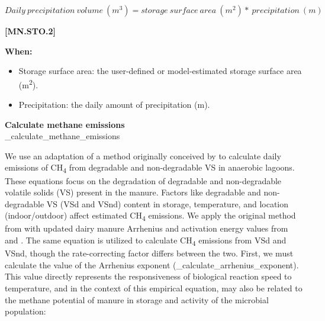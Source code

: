 \begin{refsection}
    \begin{center}
\(Daily\ precipitation\ volume\ (m^3)= storage\ surface\ area\ (m^2)*\ precipitation\ (m)\)
    \end{center}
        \vspace{0.5cm} 
    
            {\raggedleft \textbf{[MN.STO.2]}\par}
            \vspace{0.5cm}

    \textbf{When:}
    \begin{itemize}
        \item Storage surface area: the user-defined  or model-estimated storage surface area (m\textsuperscript{2}). 
        \item Precipitation: the daily amount of precipitation (m).

    \end{itemize}
    \vspace{0.3cm}

    \textbf{Calculate methane emissions}\\
    \_calculate\_methane\_emissions\\
    \vspace{0.2cm}

    We use an adaptation of a method originally conceived by \cite{Sommer2004} to calculate daily emissions of CH\textsubscript{4} from degradable and non-degradable VS in anaerobic lagoons. These equations focus on the degradation of degradable and non-degradable volatile solids (VS) present in the manure. Factors like degradable and non-degradable VS (VSd and VSnd) content in storage, temperature, and location (indoor/outdoor) affect estimated CH\textsubscript{4} emissions. We apply the original method from \cite{Sommer2022} with updated dairy manure Arrhenius and activation energy values from \cite{Elsgaard2016} and \cite{Petersen2024}. The same equation is utilized to calculate CH\textsubscript{4} emissions from VSd and VSnd, though the rate-correcting factor differs between the two.
    \vspace{0.2cm}
    First, we must calculate the value of the Arrhenius exponent (\_calculate\_arrhenius\_exponent). This value directly represents the responsiveness of biological reaction speed to temperature, and in the context of this empirical equation, may also be related to the methane potential of manure in storage and activity of the microbial population:
        \vspace{0.5cm}


\end{refsection}
